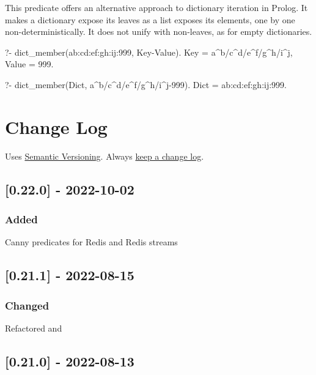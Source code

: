 This predicate offers an alternative approach to dictionary iteration in
Prolog. It makes a dictionary expose its leaves as a list exposes its
elements, one by one non-deterministically. It does not unify with
non-leaves, as for empty dictionaries.

\begin{code}
?- dict_member(a{b:c{d:e{f:g{h:i{j:999}}}}}, Key-Value).
Key = a^b/c^d/e^f/g^h/i^j,
Value = 999.

?- dict_member(Dict, a^b/c^d/e^f/g^h/i^j-999).
Dict = a{b:c{d:e{f:g{h:i{j:999}}}}}.
\end{code}

\chapter{Change Log}

Uses \href{https://semver.org/}{Semantic Versioning}. Always \href{https://keepachangelog.com/en/1.0.0/}{keep a change
log}.

\section{[0.22.0] - 2022-10-02}

\subsection{Added}

\begin{shortlist}
    \item Canny predicates for Redis and Redis streams
\end{shortlist}

\section{[0.21.1] - 2022-08-15}

\subsection{Changed}

\begin{shortlist}
    \item Refactored  and 
\end{shortlist}

\section{[0.21.0] - 2022-08-13}

